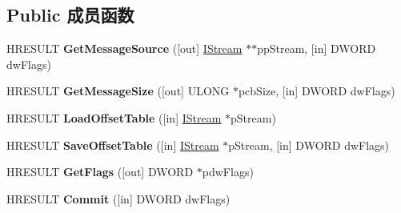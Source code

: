 \subsection*{Public 成员函数}
\begin{DoxyCompactItemize}
\item 
\mbox{\label{interface_m_i_m_e_o_l_e_1_1_i_mime_message_tree_a60ab4baea10f87c363cbfbea8a815573}} 
H\+R\+E\+S\+U\+LT {\bfseries Get\+Message\+Source} (\mbox{[}out\mbox{]} \hyperlink{interface_i_stream}{I\+Stream} $\ast$$\ast$pp\+Stream, \mbox{[}in\mbox{]} D\+W\+O\+RD dw\+Flags)
\item 
\mbox{\label{interface_m_i_m_e_o_l_e_1_1_i_mime_message_tree_aa7fc4f30189719d4ccd4894439babef1}} 
H\+R\+E\+S\+U\+LT {\bfseries Get\+Message\+Size} (\mbox{[}out\mbox{]} U\+L\+O\+NG $\ast$pcb\+Size, \mbox{[}in\mbox{]} D\+W\+O\+RD dw\+Flags)
\item 
\mbox{\label{interface_m_i_m_e_o_l_e_1_1_i_mime_message_tree_ae86480707fd19138be327d928b316513}} 
H\+R\+E\+S\+U\+LT {\bfseries Load\+Offset\+Table} (\mbox{[}in\mbox{]} \hyperlink{interface_i_stream}{I\+Stream} $\ast$p\+Stream)
\item 
\mbox{\label{interface_m_i_m_e_o_l_e_1_1_i_mime_message_tree_a8bbdfde06c746aa7419521de38ea96e7}} 
H\+R\+E\+S\+U\+LT {\bfseries Save\+Offset\+Table} (\mbox{[}in\mbox{]} \hyperlink{interface_i_stream}{I\+Stream} $\ast$p\+Stream, \mbox{[}in\mbox{]} D\+W\+O\+RD dw\+Flags)
\item 
\mbox{\label{interface_m_i_m_e_o_l_e_1_1_i_mime_message_tree_a04064141dbd3792b802ab4fa7a2aa25e}} 
H\+R\+E\+S\+U\+LT {\bfseries Get\+Flags} (\mbox{[}out\mbox{]} D\+W\+O\+RD $\ast$pdw\+Flags)
\item 
\mbox{\label{interface_m_i_m_e_o_l_e_1_1_i_mime_message_tree_a3b64bb76bc8f81f45dfcabc18c2205f3}} 
H\+R\+E\+S\+U\+LT {\bfseries Commit} (\mbox{[}in\mbox{]} D\+W\+O\+RD dw\+Flags)
\item 
\mbox{\label{interface_m_i_m_e_o_l_e_1_1_i_mime_message_tree_aeaeedece6bc7380321467ef97c0ef7a2}} 
$$
\end{DoxyCompactItemize}
